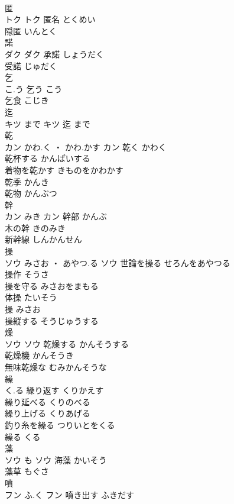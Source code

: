 \documentclass[8pt]{extreport}
\begin{document}
\begin{CJK}{UTF8}{min}
\\	匿	
\\	トク		トク	匿名	とくめい	
\\	隠匿	いんとく	
\\	諾	
\\	ダク		ダク	承諾	しょうだく	
\\	受諾	じゅだく	
\\	乞	
\\	こ.う		乞う	こう	
\\	乞食	こじき	
\\	迄	
\\	キツ	まで	キツ													迄	まで	
\\	乾	
\\	カン	かわ.く ・ かわ.かす	カン	乾く	かわく	
\\	乾杯する	かんぱいする	
\\	着物を乾かす	きものをかわかす	
\\	乾季	かんき	
\\	乾物	かんぶつ	
\\	幹	
\\	カン	みき	カン	幹部	かんぶ	
\\	木の幹	きのみき	
\\	新幹線	しんかんせん	
\\	操	
\\	ソウ	みさお ・ あやつ.る	ソウ	世論を操る	せろんをあやつる	
\\	操作	そうさ	
\\	操を守る	みさおをまもる	
\\	体操	たいそう	
\\	操	みさお	
\\	操縦する	そうじゅうする	
\\	燥	
\\	ソウ		ソウ	乾燥する	かんそうする	
\\	乾燥機	かんそうき	
\\	無味乾燥な	むみかんそうな	
\\	繰	
\\	く.る		繰り返す	くりかえす	
\\	繰り延べる	くりのべる	
\\	繰り上げる	くりあげる	
\\	釣り糸を繰る	つりいとをくる	
\\	繰る	くる	
\\	藻	
\\	ソウ	も	ソウ	海藻	かいそう	
\\	藻草	もぐさ	
\\	噴	
\\	フン	ふ.く	フン	噴き出す	ふきだす	

\end{CJK}
\end{document}
